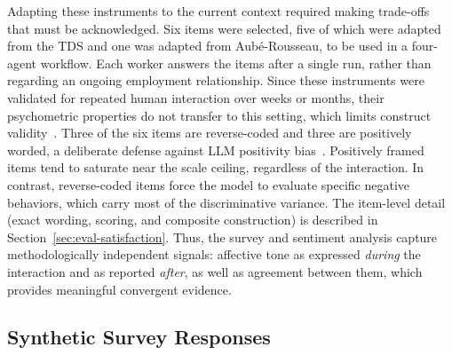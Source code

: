 Adapting these instruments to the current context required making trade-offs that must be acknowledged.
Six items were selected, five of which were adapted from the \ac{TDS} and one was adapted from Aubé-Rousseau, to be used in a four-agent workflow.
Each worker answers the items after a single run, rather than regarding an ongoing employment relationship.
Since these instruments were validated for repeated human interaction over weeks or months, their psychometric properties do not transfer to this setting, which limits construct validity~\cite{dominguezolmedo2024questioningsurveyresponseslarge, serapiogarcia2025personalitytraitslargelanguage}.
Three of the six items are reverse-coded and three are positively worded, a deliberate defense against \ac{LLM} positivity bias~\cite{dominguezolmedo2024questioningsurveyresponseslarge, zheng2023judgingllmasajudgemtbenchchatbot}. 
Positively framed items tend to saturate near the scale ceiling, regardless of the interaction.
In contrast, reverse-coded items force the model to evaluate specific negative behaviors, which carry most of the discriminative variance.
The item-level detail (exact wording, scoring, and composite construction) is described in Section~\ref{sec:eval-satisfaction}.
Thus, the survey and sentiment analysis capture methodologically independent signals:
affective tone as expressed \textit{during} the interaction and as reported \textit{after}, as well as agreement between them, which provides meaningful convergent evidence.

\subsection{Synthetic Survey Responses}
\label{subsec:synthetic-survey-responses}

